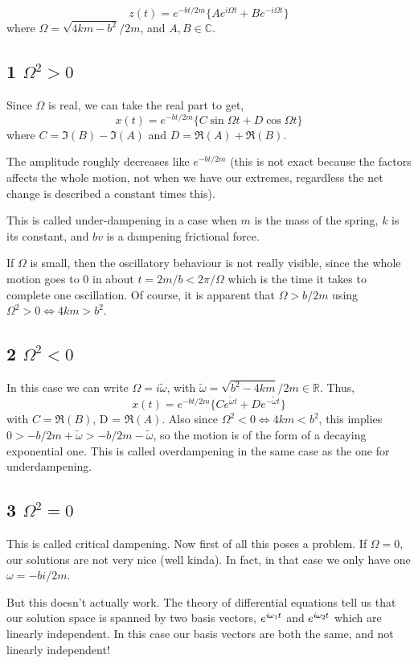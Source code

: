 $$
z(t) = e^{-bt/2m}\{Ae^{i\Omega t} + Be^{-i\Omega t}\}
$$
where $\Omega = \sqrt{4km-b^2 }/2m$, and $A, B \in \mathbb{C}$.

\subsection{1 $\Omega^2 > 0$}

Since $\Omega$ is real, we can take the real part to get,
$$
x(t) = e^{-bt / 2m}\{C\sin \Omega t + D\cos \Omega t\}
$$
where $C = \Im(B) - \Im(A)$ and $D = \Re(A) + \Re(B)$.

The amplitude roughly decreases like $e^{-bt /2m}$ (this is not exact because the factors affects the whole motion, not when we have our extremes, regardless the net change is described a constant times this).

This is called under-dampening in a case when $m$ is the mass of the spring, $k$ is its constant, and $bv$ is a dampening frictional force.


If $\Omega$ is small, then the oscillatory behaviour is not really visible, since the whole motion goes to $0$ in about ${} t = 2m/b < 2\pi/\Omega {}$ which is the time it takes to complete one oscillation. Of course, it is apparent that $\Omega > b/2m$ using $\Omega^2 > 0 \iff 4km > b^2$.

\subsection{2  $\Omega^2 < 0$}

In this case we can write $\Omega = i\tilde{\omega}$, with $\tilde{\omega} = \sqrt{ b^2 - 4km}/2m\in \mathbb{R}$. Thus,
$$
x(t) = e^{-bt /2m}\{Ce^{\tilde{\omega}t} + De^{-\tilde{\omega}t}\}
$$
with $C = \Re(B)$, D = $\Re(A)$. Also since $\Omega ^2 < 0 \iff 4km < b^2$, this implies $0 >-b/2m + \tilde{\omega} > -b/2m - \tilde{\omega}$, so the motion is of the form of a decaying exponential one. This is called overdampening in the same case as the one for underdampening.


\subsection{3  $\Omega^2 = 0$}

This is called critical dampening. Now first of all this poses a problem. If $\Omega = 0$, our solutions are not very nice (well kinda). In fact, in that case we only have one $\omega  = -bi/2m$. 

But this doesn’t actually work. The theory of differential equations tell us that our solution space is spanned by two basis vectors, $e^{i\hspace{-0.05em}\omega_{1}\hspace{-0.05em} t}$ and $e^{i\hspace{-0.05em}\omega_{2}\hspace{-0.05em} t}$ which are linearly independent. In this case our basis vectors are both the same, and not linearly independent! 

